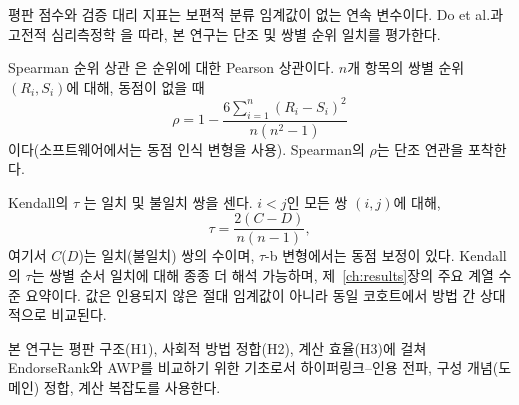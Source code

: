 
평판 점수와 검증 대리 지표는 보편적 분류 임계값이 없는 연속 변수이다. Do et al.과 고전적 심리측정학 을 따라, 본 연구는 단조 및 쌍별 순위 일치를 평가한다.

Spearman 순위 상관 은 순위에 대한 Pearson 상관이다. $n$개 항목의 쌍별 순위 $(R_i,S_i)$에 대해, 동점이 없을 때
\begin{equation}
\rho = 1 - \frac{6\sum_{i=1}^n (R_i-S_i)^2}{n(n^2-1)}
\label{eq:spearman}
\end{equation}
이다(소프트웨어에서는 동점 인식 변형을 사용). Spearman의 $\rho$는 단조 연관을 포착한다.

Kendall의 $\tau$ 는 일치 및 불일치 쌍을 센다. $i<j$인 모든 쌍 $(i,j)$에 대해,
\begin{equation}
\tau = \frac{2(C - D)}{n(n-1)},
\label{eq:kendall}
\end{equation}
여기서 $C$($D$)는 일치(불일치) 쌍의 수이며, $\tau$-b 변형에서는 동점 보정이 있다. Kendall의 $\tau$는 쌍별 순서 일치에 대해 종종 더 해석 가능하며, 제~\ref{ch:results}장의 주요 계열 수준 요약이다. 값은 인용되지 않은 절대 임계값이 아니라 동일 코호트에서 방법 간 상대적으로 비교된다.


본 연구는 평판 구조(H1), 사회적 방법 정합(H2), 계산 효율(H3)에 걸쳐 EndorseRank와 AWP를 비교하기 위한 기초로서 하이퍼링크--인용 전파, 구성 개념(도메인) 정합, 계산 복잡도를 사용한다.


